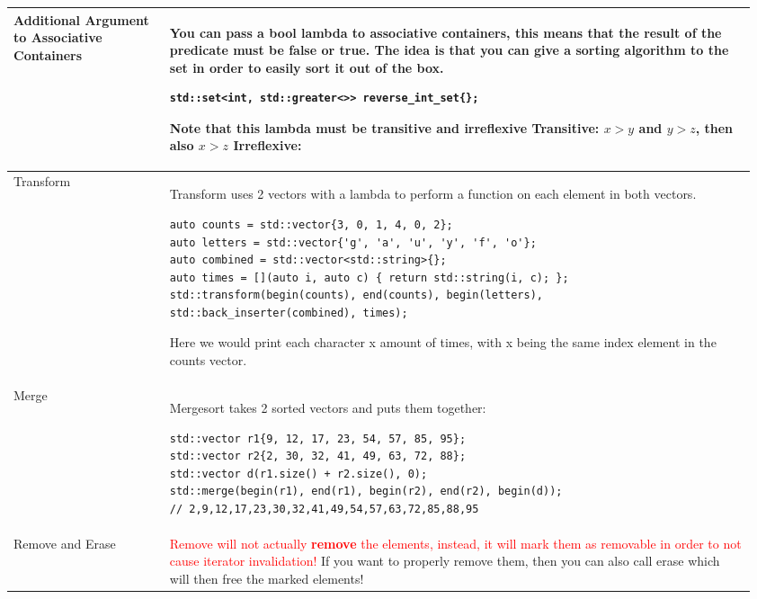 \documentclass[main.tex,fontsize=8pt,paper=a4,paper=portrait,DIV=calc,]{scrartcl}
\begin{document}
\begin{table}[ht!]
\begin{tabular}{|m{0.2\linewidth}|m{0.755\linewidth}|}
\hline
Additional Argument to Associative Containers & 
You can pass a bool lambda to associative containers, this means that the result of the predicate must be false or true.\newline
The idea is that you can give a sorting algorithm to the set in order to easily sort it out of the box.\newline
\begin{lstlisting}
std::set<int, std::greater<>> reverse_int_set{};
\end{lstlisting}
\textcolor{OliveGreen}{Note that this lambda must be \textbf{transitive and irreflexive}}\newline
Transitive: \(x > y\) and \(y > z\), then also \(x > z\)\newline
Irreflexive: \\
\hline
Transform & 
Transform uses 2 vectors with a lambda to perform a function on each element in both vectors.\newline
\begin{lstlisting}
auto counts = std::vector{3, 0, 1, 4, 0, 2};
auto letters = std::vector{'g', 'a', 'u', 'y', 'f', 'o'};
auto combined = std::vector<std::string>{};
auto times = [](auto i, auto c) { return std::string(i, c); };
std::transform(begin(counts), end(counts), begin(letters),
std::back_inserter(combined), times);
\end{lstlisting}
Here we would print each character x amount of times, with x being the same index element in the counts vector.\\
\hline
Merge & 
Mergesort takes 2 sorted vectors and puts them together:\newline
\begin{lstlisting}
std::vector r1{9, 12, 17, 23, 54, 57, 85, 95};
std::vector r2{2, 30, 32, 41, 49, 63, 72, 88};
std::vector d(r1.size() + r2.size(), 0);
std::merge(begin(r1), end(r1), begin(r2), end(r2), begin(d));
// 2,9,12,17,23,30,32,41,49,54,57,63,72,85,88,95
\end{lstlisting}\\
\hline
Remove and Erase & 
\textcolor{red}{Remove will not actually \textbf{remove} the elements, instead, it will mark them as removable in order to not cause iterator invalidation!}\newline
\textcolor{OliveGreen}{If you want to properly remove them, then you can also call erase which will then free the marked elements!}\newline

\end{tabular}
\end{table}
\end{document}
